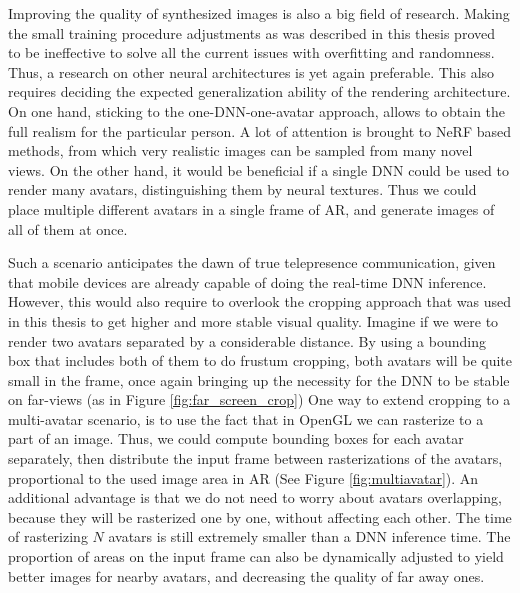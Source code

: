 Improving the quality of synthesized images is also a big field of research. Making the small training procedure adjustments as was described in this thesis proved to be ineffective to solve all the current issues with overfitting and randomness. Thus, a research on other neural architectures is yet again preferable. This also requires deciding the expected generalization ability of the rendering architecture. On one hand, sticking to the one-DNN-one-avatar approach, allows to obtain the full realism for the particular person. A lot of attention is brought to NeRF \cite{dnn:nerf20, dnn:phorhum22} based methods, from which very realistic images can be sampled from many novel views. On the other hand, it would be beneficial if a single DNN could be used to render many avatars, distinguishing them by neural textures. Thus we could place multiple different avatars in a single frame of AR, and generate images of all of them at once. 

Such a scenario anticipates the dawn of true telepresence communication, given that mobile devices are already capable of doing the real-time DNN inference. However, this would also require to overlook the cropping approach that was used in this thesis to get higher and more stable visual quality. Imagine if we were to render two avatars separated by a considerable distance. By using a bounding box that includes both of them to do frustum cropping, both avatars will be quite small in the frame, once again bringing up the necessity for the DNN to be stable on far-views (as in Figure \ref{fig:far_screen_crop}) One way to extend cropping to a multi-avatar scenario, is to use the fact that in OpenGL we can rasterize to a part of an image. Thus, we could compute bounding boxes for each avatar separately, then distribute the input frame between rasterizations of the avatars, proportional to the used image area in AR (See Figure \ref{fig:multiavatar}). An additional advantage is that we do not need to worry about avatars overlapping, because they will be rasterized one by one, without affecting each other. The time of rasterizing $N$ avatars is still extremely smaller than a DNN inference time. The proportion of areas on the input frame can also be dynamically adjusted to yield better images for nearby avatars, and decreasing the quality of far away ones.


